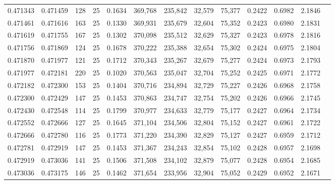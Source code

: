 \begin{tabular}{rrrrrrrrrrrrr}
0.471343 & 0.471459 &   128 &  25 &                                     0.1634 & 369,768 & 235,842 &  32,579 &  75,377 & 0.2422 & 0.6982 & 2.1846 \\
0.471461 & 0.471616 &   163 &  25 &                                     0.1330 & 369,931 & 235,679 &  32,604 &  75,352 & 0.2423 & 0.6980 & 2.1831 \\
0.471619 & 0.471755 &   167 &  25 &                                     0.1302 & 370,098 & 235,512 &  32,629 &  75,327 & 0.2423 & 0.6978 & 2.1816 \\
0.471756 & 0.471869 &   124 &  25 &                                     0.1678 & 370,222 & 235,388 &  32,654 &  75,302 & 0.2424 & 0.6975 & 2.1804 \\
0.471870 & 0.471977 &   121 &  25 &                                     0.1712 & 370,343 & 235,267 &  32,679 &  75,277 & 0.2424 & 0.6973 & 2.1793 \\
0.471977 & 0.472181 &   220 &  25 &                                     0.1020 & 370,563 & 235,047 &  32,704 &  75,252 & 0.2425 & 0.6971 & 2.1772 \\
0.472182 & 0.472300 &   153 &  25 &                                     0.1404 & 370,716 & 234,894 &  32,729 &  75,227 & 0.2426 & 0.6968 & 2.1758 \\
0.472300 & 0.472429 &   147 &  25 &                                     0.1453 & 370,863 & 234,747 &  32,754 &  75,202 & 0.2426 & 0.6966 & 2.1745 \\
0.472430 & 0.472548 &   114 &  25 &                                     0.1799 & 370,977 & 234,633 &  32,779 &  75,177 & 0.2427 & 0.6964 & 2.1734 \\
0.472552 & 0.472666 &   127 &  25 &                                     0.1645 & 371,104 & 234,506 &  32,804 &  75,152 & 0.2427 & 0.6961 & 2.1722 \\
0.472666 & 0.472780 &   116 &  25 &                                     0.1773 & 371,220 & 234,390 &  32,829 &  75,127 & 0.2427 & 0.6959 & 2.1712 \\
0.472781 & 0.472919 &   147 &  25 &                                     0.1453 & 371,367 & 234,243 &  32,854 &  75,102 & 0.2428 & 0.6957 & 2.1698 \\
0.472919 & 0.473036 &   141 &  25 &                                     0.1506 & 371,508 & 234,102 &  32,879 &  75,077 & 0.2428 & 0.6954 & 2.1685 \\
0.473036 & 0.473175 &   146 &  25 &                                     0.1462 & 371,654 & 233,956 &  32,904 &  75,052 & 0.2429 & 0.6952 & 2.1671 \\

\end{tabular}
